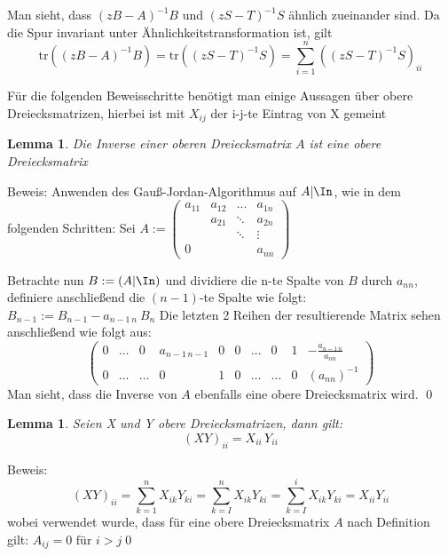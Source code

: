 \documentclass[a4paper,12pt]{report}
\newcommand{\tr}{\text{tr}}
\newcommand{\inv}{^{-1}}
\theoremstyle{plain} %
\newtheorem{lemma}[theorem]{Lemma}  %
\theoremstyle{definition} %
\theoremstyle{remark}
\begin{document}
            Man sieht, dass $(zB-A)\inv B$ und  $(zS-T)\inv S$ ähnlich zueinander sind.
            Da die Spur invariant unter Ähnlichkeitstransformation ist, gilt
            \begin{equation}
                  \label{eqn: Haltepunkt Bew Futamura}
                  \tr((zB-A)\inv B) = \tr((zS-T)\inv S) = \sum_{i=1}^{n}((zS-T)\inv S)_{ii}
            \end{equation}

            Für die folgenden Beweisschritte benötigt man einige Aussagen über obere Dreiecksmatrizen, hierbei ist mit $X_{ij}$ der i-j-te Eintrag von X gemeint

            \begin{lemma}
                  \label{Hilfslemma_Futamura: Inv Dreieck}
                  Die Inverse einer oberen Dreiecksmatrix $A$ ist eine obere Dreiecksmatrix
            \end{lemma}
            Beweis:
            Anwenden des Gauß-Jordan-Algorithmus auf $A|\In$, wie in dem folgenden Schritten:
            Sei $A:= \begin{pmatrix}
                  a_{11} & a_{12} & ... & a_{1n}\\
                  & a_{21} &\ddots&a_{2n}\\
                   &  & \ddots &\vdots\\
                  0 &  & &a_{nn}
            \end{pmatrix}$

            Betrachte nun $B:=(A\vert \In)$ und dividiere die n-te Spalte von $B$ durch $a_{nn}$, definiere anschließend die $(n-1)$-te Spalte wie folgt:
            $B_{n-1}:=B_{n-1}-a_{n-1\, n}\ B_{n}$
            Die letzten 2 Reihen der resultierende Matrix sehen anschließend wie folgt aus:
            $$\left(\begin{array}{ccccc|cccccc}
                  0 & \dots & 0 & a_{n-1\, n-1}& 0&0&\dots&0&1&-\frac{a_{n-1\, n}}{a_{nn}}\\
                  0 & \dots & \dots & 0&1&0&\dots&\dots&0&(a_{nn})^{-1}
                \end{array}\right)$$
            Man sieht, dass die Inverse von $A$ ebenfalls eine obere Dreiecksmatrix wird. \qed

            \begin{lemma}
                  \label{Hilfslemma_Futamura: Prod Dreieck}
                  Seien X und Y obere Dreiecksmatrizen, dann gilt:
                  $$(XY)_{ii} = X_{ii}\, Y_{ii}$$
            \end{lemma}
            Beweis:
            $$(XY)_{ii} = \sum_{k=1}^n X_{ik}Y_{ki} = \sum_{k=I}^{n}X_{ik}Y_{ki} = \sum_{k=I}^{i}X_{ik}Y_{ki} = X_{ii} Y_{ii}$$
            wobei verwendet wurde, dass für eine obere Dreiecksmatrix $A$ nach Definition gilt:
            $A_{ij} = 0 \text{ für }i>j$\qed
\end{document}
